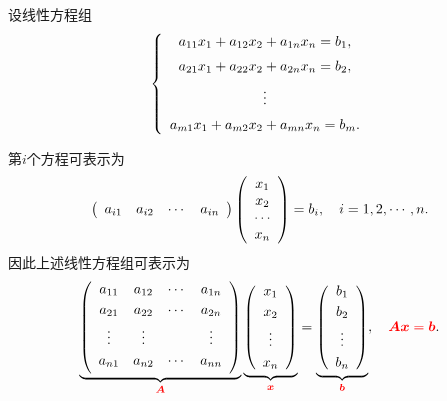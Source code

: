\begin{frame}

设线性方程组
$$
\left\{
  \begin{array}{c}
    a_{11}x_1 + a_{12}x_2 + a_{1n}x_n = b_1, \\[0.2cm]
    a_{21}x_1 + a_{22}x_2 + a_{2n}x_n = b_2, \\[0.2cm]
    \vdots \\[0.2cm]
    a_{m1}x_1 + a_{m2}x_2 + a_{mn}x_n = b_m.
  \end{array}
\right.
$$

第$i$个方程可表示为
$$
\left(
  \begin{array}{cccc}
    a_{i1} & a_{i2} & \cdots &  a_{in}
  \end{array}
\right)
\left(
  \begin{array}{c}
    x_{1} \\
    x_{2} \\
    \cdots   \\
    x_{n}
  \end{array}
\right) = b_i, \quad i=1,2,\cdots,n.
$$ 
因此上述线性方程组可表示为
$$
\underbrace{
  \left(
    \begin{array}{cccc}
      a_{11} & a_{12} & \cdots &  a_{1n} \\[0.1cm]
      a_{21} & a_{22} & \cdots &  a_{2n} \\[0.1cm]
      \vdots   & \vdots   &     & \vdots \\[0.1cm]
      a_{n1} & a_{n2} & \cdots &  a_{nn} \\[0.1cm]
    \end{array}
  \right)
}_{\textcolor{red}{\boldsymbol{A}}}
\underbrace{
  \left(
    \begin{array}{c}
      x_{1} \\[0.1cm]
      x_{2} \\[0.1cm]
      \vdots  \\[0.1cm]
      x_{n}
    \end{array}
  \right)
}_{\textcolor{red}{{\boldsymbol{x}}}}
=     
\underbrace{
  \left(
    \begin{array}{c}
      b_{1} \\[0.1cm]
      b_{2} \\[0.1cm]
      \vdots  \\[0.1cm]
      b_{n}
    \end{array}
  \right)
}_{\textcolor{red}{{\boldsymbol{b}}}},  
\quad \textcolor{red}{\boldsymbol{A}{\boldsymbol{x}}={\boldsymbol{b}}}.
$$
% 
% 
\end{frame}

